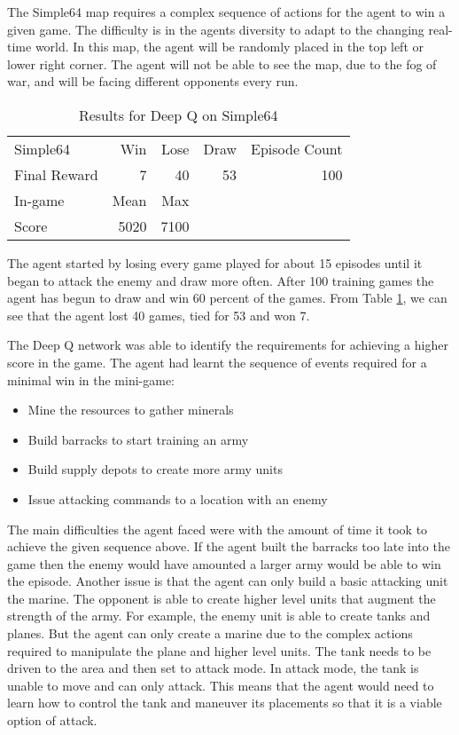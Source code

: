 The Simple64 map requires a complex sequence of actions for the agent to win a given game. The difficulty is in the agents diversity to adapt to the changing real-time world. In this map, the agent will be randomly placed in the top left or lower right corner. The agent will not be able to see the map, due to the fog of war, and will be facing different opponents every run. 

\begin{table}[h]
    \centering
    \begin{tabular}{@{}lrrrr@{}}
        \toprule
        Simple64                    & Win & Lose &Draw  & Episode Count \\
        Final Reward                & 7 & 40  & 53 & 100 \\
        \midrule
        In-game         		       & Mean & Max  \\
        Score      				   & 5020   & 7100 \\
 \bottomrule
    \end{tabular}
    \caption{Results for Deep Q on Simple64}%
    \label{tab:dqn_simple}%
\end{table}

The agent started by losing every game played for about 15 episodes until it began to attack the enemy and draw more often. After 100 training games the agent has begun to draw and win 60 percent of the games. From Table \ref{tab:dqn_simple}, we can see that the agent lost 40 games, tied for 53 and won 7.

The Deep Q network was able to identify the requirements for achieving a higher score in the game. The agent had learnt the sequence of events required for a minimal win in the mini-game:

\begin{itemize}
\item Mine the resources to gather minerals

\item Build barracks to start training an army

\item Build supply depots to create more army units

\item Issue attacking commands to a location with an enemy
\end{itemize}

The main difficulties the agent faced were with the amount of time it took to achieve the given sequence above. If the agent built the barracks too late into the game then the enemy would have amounted a larger army would be able to win the episode. Another issue is that the agent can only build a basic attacking unit the marine. The opponent is able to create higher level units that augment the strength of the army. For example, the enemy unit is able to create tanks and planes. But the agent can only create a marine due to the complex actions required to manipulate the plane and higher level units. The tank needs to be driven to the area and then set to attack mode. In attack mode, the tank is unable to move and can only attack. This means that the agent would need to learn how to control the tank and maneuver its placements so that it is a viable option of attack.


